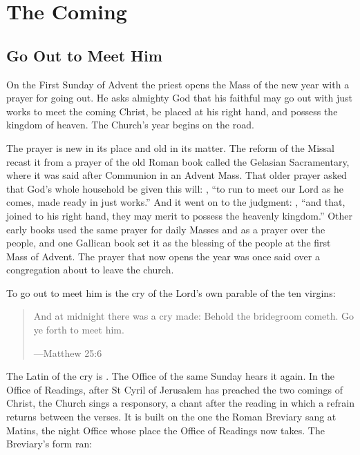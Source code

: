 \section{The Coming}

\subsection{Go Out to Meet Him}\label{sec:meet}

On the First Sunday of Advent the priest opens the Mass of the new year with a
prayer for going out. He asks almighty God that his faithful may go out with
just works to meet the coming Christ, be placed at his right hand, and possess
the kingdom of heaven. The Church's year begins on the road.

The prayer is new in its place and old in its matter. The reform of the Missal
recast it from a prayer of the old Roman book called the Gelasian Sacramentary,
where it was said after Communion in an Advent Mass. That older prayer asked
that God's whole household be given this will:
, ``to run to
meet our Lord as he comes, made ready in just works.'' And it went on to the
judgment: ,
``and that, joined to his right hand, they may merit to possess the heavenly
kingdom.'' Other early books used the same prayer for daily Masses and as a
prayer over the people, and one Gallican book set it as the blessing of the
people at the first Mass of Advent. The prayer that now opens the year was once
said over a congregation about to leave the church.

To go out to meet him is the cry of the Lord's own parable of the ten virgins:

\begin{quote}
And at midnight there was a cry made: Behold the bridegroom cometh. Go ye forth
to meet him.\par
{\smallskip\noindent\small ---Matthew 25:6\par}
\end{quote}

\noindent The Latin of the cry is . The Office of the
same Sunday hears it again. In the Office of Readings, after St Cyril of
Jerusalem has preached the two comings of Christ, the Church sings a
responsory, a chant after the reading in which a refrain returns between the
verses. It is built on the one the Roman Breviary sang at Matins, the night
Office whose place the Office of Readings now takes. The Breviary's form ran:

